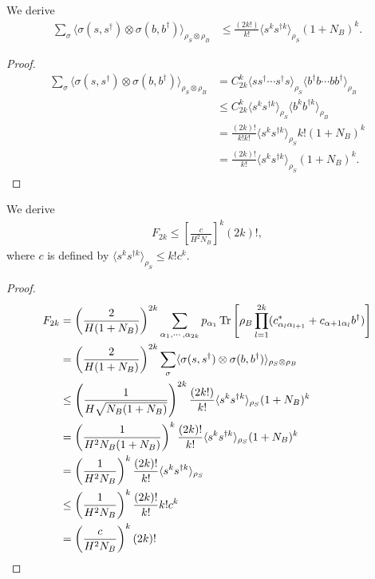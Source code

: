 \documentclass[../../note.tex]{subfiles}
\begin{document}
\begin{lemma}
    We derive
    \begin{align}
        \sum_{\sigma} \langle \sigma(s, s^\dagger) \otimes \sigma(b, b^\dagger) \rangle_{\rho_S \otimes \rho_B}
        &\leq \frac{(2k!)}{k!} \langle s^k s^{\dagger k} \rangle_{\rho_S} (1+N_B)^k.
    \end{align}
\end{lemma}
\begin{proof}
    \begin{align}
        \sum_{\sigma} \langle \sigma(s, s^\dagger) \otimes \sigma(b, b^\dagger) \rangle_{\rho_S \otimes \rho_B} 
        &= C_{2k}^{k} \langle s s^\dagger \cdots s^\dagger s \rangle_{\rho_S} \langle b^\dagger b \cdots b b^\dagger \rangle_{\rho_B} \\
        &\leq C_{2k}^{k} \langle s^k s^{\dagger k} \rangle_{\rho_S} \langle b^k b^{\dagger k} \rangle_{\rho_B} \\
        &= \frac{(2k)!}{k! k!} \langle s^k s^{\dagger k} \rangle_{\rho_S} k! (1+N_B)^k \\
        &= \frac{(2k)!}{k!} \langle s^k s^{\dagger k} \rangle_{\rho_S} (1+N_B)^k.
    \end{align}
\end{proof}

\begin{lemma}
    We derive
    \begin{align}
        F_{2k} \leq \left[\frac{c}{H^2 N_B}\right]^k (2k)!,
    \end{align}
    where $c$ is defined by $\langle s^k s^{\dagger k} \rangle_{\rho_S} \leq k! c^k$.
\end{lemma}
\begin{proof}
\begin{align}
    F_{2k} 
    &= \left(\frac{2}{H(1+N_B)}\right)^{2k} \sum_{\alpha_1, \cdots, \alpha_{2k}} p_{\alpha_1} \operatorname{Tr}\left[\rho_B \prod_{l=1}^{2k}(c_{\alpha_l \alpha_{l+1}}^\ast + c_{\alpha+1 \alpha_l} b^\dagger )\right] \\
    &= \left(\frac{2}{H(1+N_B)}\right)^{2k} \sum_{\sigma} \langle \sigma(s, s^\dagger) \otimes \sigma(b, b^\dagger) \rangle_{\rho_S \otimes \rho_B} \\
    &\leq \left( \frac{1}{H\sqrt{N_B(1+N_B)}} \right)^{2k} \frac{(2k!)}{k!} \langle s^k s^{\dagger k} \rangle_{\rho_S} (1+N_B)^k \\
    &= \left(\frac{1}{H^2 N_B (1+N_B)}\right)^k \frac{(2k)!}{k!} \langle s^k s^{\dagger k} \rangle_{\rho_S} (1+N_B)^k \\
    &= \left(\frac{1}{H^2 N_B}\right)^k \frac{(2k)!}{k!} \langle s^k s^{\dagger k} \rangle_{\rho_S} \\
    &\leq \left(\frac{1}{H^2 N_B}\right)^k \frac{(2k)!}{k!} k! c^k \\
    &= \left(\frac{c}{H^2 N_B}\right)^k (2k)!
\end{align}    
\end{proof}
\end{document}
